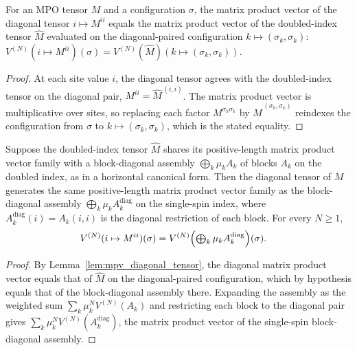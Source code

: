 \begin{lemma}
    \label{lem:mpv_diagonal_tensor}
    \leanok
    For an MPO tensor $M$ and a configuration $\sigma$, the matrix product vector of
    the diagonal tensor $i\mapsto M^{ii}$ equals the matrix product vector of the
    doubled-index tensor $\widehat{M}$ evaluated on the diagonal-paired configuration
    $k\mapsto(\sigma_k,\sigma_k)$:
    $V^{(N)}(i\mapsto M^{ii})(\sigma)
    =V^{(N)}(\widehat{M})(k\mapsto(\sigma_k,\sigma_k))$.
\end{lemma}
\begin{proof}\leanok
    At each site value $i$, the diagonal tensor agrees with the doubled-index tensor
    on the diagonal pair, $M^{ii}=\widehat{M}^{\,(i,i)}$.
    The matrix product vector is multiplicative over sites, so replacing each factor
    $M^{\sigma_k\sigma_k}$ by $\widehat{M}^{\,(\sigma_k,\sigma_k)}$ reindexes the
    configuration from $\sigma$ to $k\mapsto(\sigma_k,\sigma_k)$, which is the stated
    equality.
\end{proof}

\begin{lemma}
    \label{lem:mpv_diagonal_tensor_eq_blocks}
    \leanok
    Suppose the doubled-index tensor $\widehat{M}$ shares its positive-length matrix
    product vector family with a block-diagonal assembly
    $\bigoplus_k\mu_kA_k$ of blocks $A_k$ on
    the doubled index, as in a horizontal canonical form. Then the diagonal tensor of
    $M$ generates the same positive-length matrix product vector family as the
    block-diagonal assembly
    $\bigoplus_k\mu_kA_k^{\mathrm{diag}}$ on the single-spin index, where
    $A_k^{\mathrm{diag}}(i)=A_k(i,i)$ is the diagonal restriction of each block.
    For every $N\geq1$,
    \begin{align}
        V^{(N)}(i\mapsto M^{ii})(\sigma)
        &=V^{(N)}\Bigl(\textstyle\bigoplus_k
          \mu_kA_k^{\mathrm{diag}}\Bigr)(\sigma).
        \notag
    \end{align}
\end{lemma}
\begin{proof}\leanok
    By Lemma~\ref{lem:mpv_diagonal_tensor}, the diagonal matrix product vector equals
    that of $\widehat{M}$ on the diagonal-paired configuration, which by hypothesis
    equals that of the block-diagonal assembly there. Expanding the assembly as the
    weighted sum $\sum_k\mu_k^NV^{(N)}(A_k)$ and restricting each block to the
    diagonal pair gives $\sum_k\mu_k^NV^{(N)}(A_k^{\mathrm{diag}})$, the matrix
    product vector of the single-spin block-diagonal assembly.
\end{proof}

